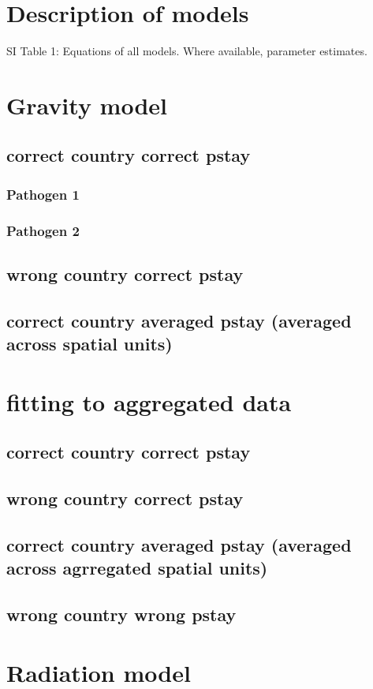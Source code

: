 \documentclass[a4paper,12pt]{article}
\begin{document}
\section{Description of models}
SI Table 1: Equations of all models. Where available, parameter
estimates.
\section{Gravity model}
\subsection{correct country correct pstay}
\subsubsection{Pathogen 1}
\subsubsection{Pathogen 2}
\subsection{wrong country correct pstay}
\subsection{correct country averaged pstay (averaged across spatial
  units)}
\section{fitting to aggregated data}
\subsection{correct country correct pstay}
\subsection{wrong country correct pstay}
\subsection{correct country averaged pstay (averaged across agrregated
  spatial units)}
\subsection{wrong country wrong pstay}
\section{Radiation model}
\end{document}
